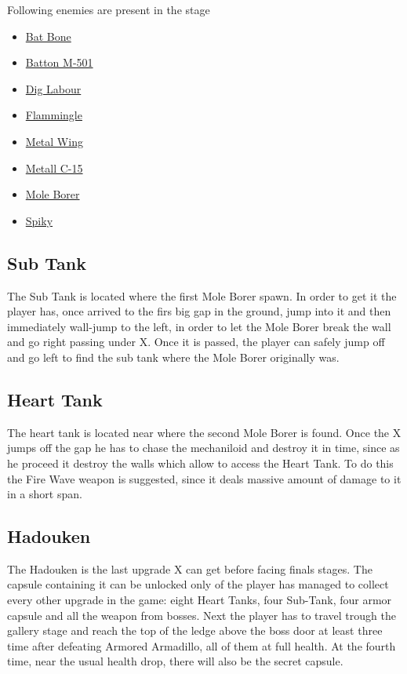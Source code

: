 Following enemies are present in the stage\cite{wiki:Gallery}
\begin{itemize}
	\item \hyperlink{enem:Bat_Bone}{Bat Bone} 
	\item \hyperlink{enem:Batton_M-501}{Batton M-501} 
	\item \hyperlink{enem:Dig_Labour}{Dig Labour} 
	\item \hyperlink{enem:Flammingle}{Flammingle} 
	\item \hyperlink{enem:Metal_Wing}{Metal Wing} 
	\item \hyperlink{enem:Metall_C-15}{Metall C-15} 
	\item \hyperlink{miniboss:Mole Borer}{Mole Borer}
	\item \hyperlink{enem:Spiky}{Spiky}
\end{itemize}

\subsection{Sub Tank}
The Sub Tank is located where the first Mole Borer spawn. In order to get it the player has, once arrived to the firs big gap in the ground, jump into it and then immediately wall-jump to the left, in order to let the Mole Borer break the wall and go right passing under X. Once it is passed, the player can safely jump off and go left to find the sub tank where the Mole Borer originally was. 

\subsection{Heart Tank}
The heart tank is located near where the second Mole Borer is found. Once the X jumps off the gap he has to chase the mechaniloid and destroy it in time, since as he proceed it destroy the walls which allow to access the Heart Tank. To do this the Fire Wave weapon is suggested, since it deals massive amount of damage to it in a short span. 

\subsection{Hadouken}\label{Hadouken}
The Hadouken is the last upgrade X can get before facing finals stages. The capsule containing it can be unlocked only of the player has managed to collect every other upgrade in the game: eight Heart Tanks, four Sub-Tank, four armor capsule and all the weapon from bosses. Next the player has to travel trough the gallery stage and reach the top of the ledge above the boss door at least three time after defeating Armored Armadillo, all of them at full health. At the fourth time, near the usual health drop, there will also be the secret capsule.

